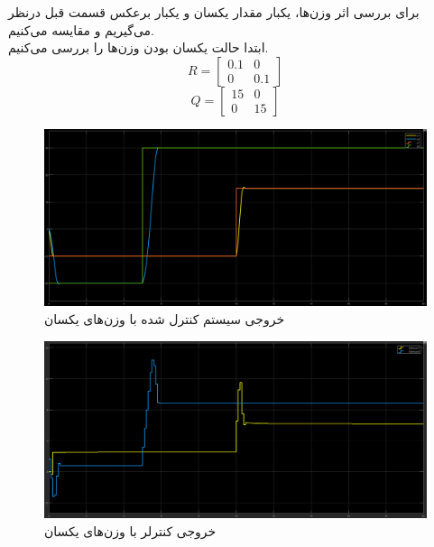 \documentclass[14pt, a4paper]{extarticle}
\begin{document}
\subsubsection{}
برای بررسی اثر وزن‌ها، یکبار مقدار یکسان و یکبار برعکس قسمت قبل درنظر می‌گیریم و مقایسه می‌کنیم.\\
ابتدا حالت یکسان بودن وزن‌ها را بررسی می‌کنیم.\\
\[
R = \begin{bmatrix}
	0.1 & 0 \\
	0 & 0.1
\end{bmatrix}
\]
\[
Q = \begin{bmatrix}
	15 & 0 \\
	0 & 15
\end{bmatrix}
\]
\begin{figure}[h!]
	\centering
	\includegraphics[scale = 0.3]{Q2_sim_result_weightsame.png}
	\caption{خروجی سیستم کنترل شده با
		وزن‌های یکسان}
\end{figure}
\begin{figure}[h!]
	\centering
	\includegraphics[scale = 0.3]{Q2_sim_control_weightsame.png}
	\caption{خروجی کنترلر با
		وزن‌های یکسان}
\end{figure}
\end{document}
